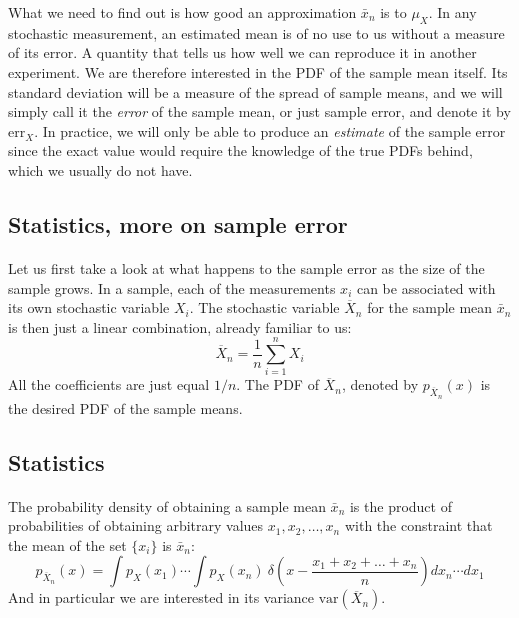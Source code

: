 \documentclass[%
oneside,                 %
final,                   %
10pt]{article}
\begin{document}
What we need to find out is how good an approximation $\bar{x}_n$ is to
$\mu_X^{\phantom X}$. In any stochastic measurement, an estimated
mean is of no use to us without a measure of its error. A quantity
that tells us how well we can reproduce it in another experiment. We
are therefore interested in the PDF of the sample mean itself. Its
standard deviation will be a measure of the spread of sample means,
and we will simply call it the \emph{error} of the sample mean, or
just sample error, and denote it by $\mathrm{err}_X^{\phantom X}$. In
practice, we will only be able to produce an \emph{estimate} of the
sample error since the exact value would require the knowledge of the
true PDFs behind, which we usually do not have.




\subsection{Statistics, more on sample error}

\paragraph{}
Let us first take a look at what happens to the sample error as the
size of the sample grows. In a sample, each of the measurements $x_i$
can be associated with its own stochastic variable $X_i$. The
stochastic variable $\overline X_n$ for the sample mean $\bar{x}_n$ is
then just a linear combination, already familiar to us:
\[
\overline X_n = \frac{1}{n}\sum_{i=1}^n X_i
\]
All the coefficients are just equal $1/n$. The PDF of $\overline X_n$,
denoted by $p_{\overline X_n}(x)$ is the desired PDF of the sample
means.



\subsection{Statistics}

\paragraph{}
The probability density of obtaining a sample mean $\bar x_n$
is the product of probabilities of obtaining arbitrary values $x_1,
x_2,\dots,x_n$ with the constraint that the mean of the set $\{x_i\}$
is $\bar x_n$:
\[
p_{\overline X_n}(x) = \int p_X^{\phantom X}(x_1)\cdots
\int p_X^{\phantom X}(x_n)\ 
\delta\!\left(x - \frac{x_1+x_2+\dots+x_n}{n}\right)dx_n \cdots dx_1
\]
And in particular we are interested in its variance $\mathrm{var}(\overline X_n)$.
\end{document}
